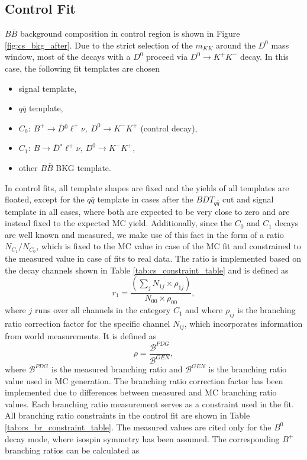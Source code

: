 \subsection{Control Fit}\label{sec:control-fit}
$B \bar B$ background composition in control region is shown in Figure \ref{fig:cs_bkg_after}. Due to the strict selection of the $m_{KK}$ around the $D^0$ mass window, most of the decays with a $D^0$ proceed via $D^0 \to K^+K^-$ decay. In this case, the following fit templates are chosen
\begin{itemize}
	\item signal template,
	\item $q \bar q$ template,
	\item $C_0:~B^+ \to \bar{D} {}^0 \ell^+ \nu,~D^0 \to K^-K^+$ (control decay),
	\item $C_1:~B \to \bar{D} {}^* \ell^+ \nu,~D^0 \to K^-K^+$,
	\item other $B \bar B$ BKG template.
\end{itemize}
In control fits, all template shapes are fixed and the yields of all templates are floated, except for the $q \bar q$ template in cases after the $BDT_{q \bar q}$ cut and signal template in all cases, where both are expected to be very close to zero and are instead fixed to the expected MC yield. Additionally, since the $C_0$ and $C_1$ decays are well known and measured, we make use of this fact in the form of a ratio $N_{C_1}/N_{C_0}$, which is fixed to the MC value in case of the MC fit and constrained to the measured value in case of fits to real data. The ratio is implemented based on the decay channels shown in Table \ref{tab:cs_constraint_table} and is defined as
\begin{equation}
r_1 = \frac{\left(\sum_j N_{1j}\times \rho_{1j} \right)}{N_{00} \times \rho_{00}},
\label{eq:cs_fix}
\end{equation}
where $j$ runs over all channels in the category $C_1$ and where $\rho_{ij}$ is the branching ratio correction factor for the specific channel $N_{ij}$, which incorporates information from world measurements. It is defined as 
\begin{equation}
\rho = \frac{\mathcal{B}^{PDG}}{\mathcal{B}^{GEN}},
\label{eq:br_fix}
\end{equation}
where $\mathcal{B}^{PDG}$ is the measured branching ratio and $\mathcal{B}^{GEN}$ is the branching ratio value used in MC generation. The branching ratio correction factor has been implemented due to differences between measured and MC branching ratio values. Each branching ratio measurement serves as a constraint used in the fit. All branching ratio constraints in the control fit are shown in Table \ref{tab:cs_br_constraint_table}. The measured values are cited only for the $B^0$ decay mode, where isospin symmetry has been assumed. The corresponding $B^+$ branching ratios can be calculated as
